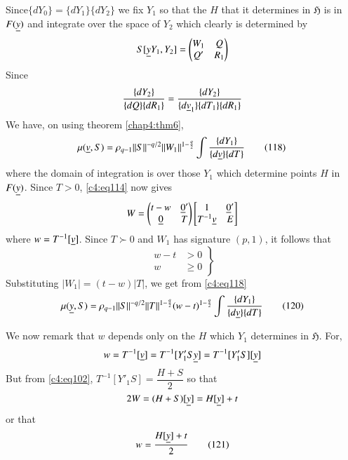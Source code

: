 Since\pageoriginale $\{dY_{0}\}=\{dY_{1}\}\{dY_{2}\}$ we fix $Y_{1}$
so that the $H$ that it determines in $\mathfrak{H}$ is in $F(\underline{y})$
and integrate over the space of $Y_{2}$ which clearly is determined by
$$
S[\underline{y}Y_{1},Y_{2}]=
\begin{pmatrix}
W_{1} & Q\\
Q' & R_{1}
\end{pmatrix}
$$
Since 
$$
\frac{\{dY_{2}\}}{\{dQ\}\{dR_{1}\}}=
\frac{\{dY_{2}\}}{\{d\underline{v}_{1}\}\{dT_{1}\}\{dR_{1}\}}
$$
We have, on using theorem \ref{chap4:thm6},
\begin{equation*}
\mu(\underline{v},S)=\rho_{q-1}||S||^{-q/2}||W_{1}||^{1-\frac{q}{2}}\int
\frac{\{dY_{1}\}}{\{d\underline{v}\}\{dT\}}\tag{118}\label{c4:eq118} 
\end{equation*}
where the domain of integration is over those $Y_{1}$ which determine
points $H$ in $F(\underline{y})$. Since $T>0$, \eqref{c4:eq114} now gives
$$
W=
\begin{pmatrix}
t-w & \underline{0}'\\
\underline{0} & T
\end{pmatrix}
\begin{bmatrix}
1 & \underline{0}'\\
T^{-1}\underline{v} & E
\end{bmatrix}
$$
where $w=T^{-1}[\underline{v}]$. Since $T \succ 0$ and $W_{1}$ has signature
$(p,1)$, it follows that
\begin{equation*}
\left.
\begin{aligned}
w-t &> 0\\
 w &\geq 0
\end{aligned}
\right\}\tag{119}\label{c4:eq119}
\end{equation*}
Substituting $|W_{1}|=(t-w)|T|$, we get from \eqref{c4:eq118}
\begin{equation*}
\mu(\underline{y},S)=\rho_{q-1}||S||^{-q/2}||T||^{1-\frac{q}{2}}(w-t)^{1-\frac{q}{2}}\int
\frac{\{dY_{1}\}}{\{d\underline{v}\}\{dT\}}\tag{120}\label{c4:eq120} 
\end{equation*}

We now remark that $w$ depends only on the $H$ which $Y_{1}$
determines in $\mathfrak{H}$. For, 
$$
w=T^{-1}[\underline{v}]=T^{-1}[Y'_{1}S\underline{y}]=T^{-1}[Y'_{1}S][\underline{y}]
$$\pageoriginale
But from \eqref{c4:eq102}, $T^{-1}[Y'_{1}S]=\dfrac{H+S}{2}$ so that
$$
2W=(H+S)[\underline{y}]=H[\underline{y}]+t
$$
or that
\begin{equation*}
w=\frac{H[\underline{y}]+t}{2}\tag{121}\label{c4:eq121}
\end{equation*}

